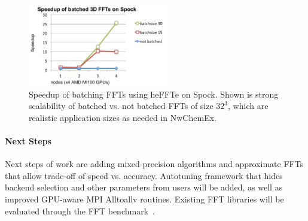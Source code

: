 \begin{figure}[htb]
   \centering
   \includegraphics[width=0.55\textwidth]{projects/2.3.3-MathLibs/2.3.3.13-CLOVER/batchedFFT-Spock.pdf}
    \caption{\label{fig:fft-batched}
    Speedup of batching FFTs using heFFTe on Spock.
    Shown is strong scalability of batched vs. not batched FFTs of 
    size $32^3$, which are realistic application sizes as needed in NwChemEx.
    }
\end{figure}


\paragraph{Next Steps}
Next steps of work are adding mixed-precision algorithms and approximate FFTs that 
allow trade-off of speed vs. accuracy.
Autotuning framework that hides backend selection and other parameters from users
will be added, as well as improved GPU-aware MPI Alltoallv routines. 
Existing FFT libraries will be evaluated through the FFT 
benchmark~\cite{fftbenchmark}.

\newpage
